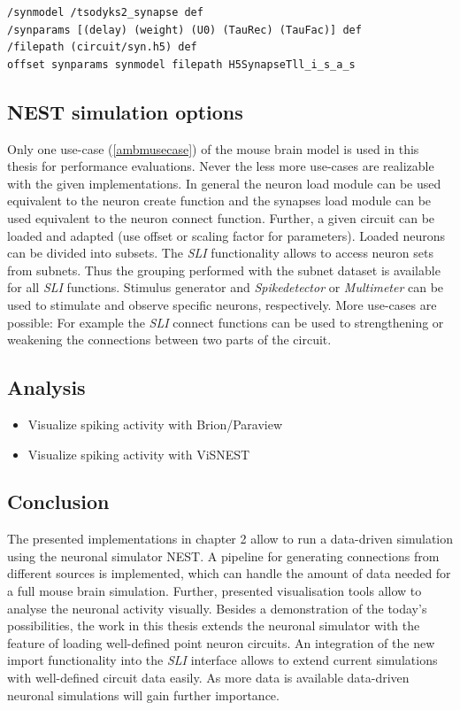 \begin{lstlisting}[label=sliSynapses,caption=Example importing synapses]
/synmodel /tsodyks2_synapse def
/synparams [(delay) (weight) (U0) (TauRec) (TauFac)] def
/filepath (circuit/syn.h5) def
offset synparams synmodel filepath H5SynapseTll_i_s_a_s
\end{lstlisting}

\subsection{NEST simulation options}

Only one use-case (\ref{ambmusecase}) of the mouse brain model is used in this thesis for performance evaluations.
Never the less more use-cases are realizable with the given implementations.
In general the neuron load module can be used equivalent to the neuron create function
and the synapses load module can be used equivalent to the neuron connect function.
Further, a given circuit can be loaded and adapted (use offset or scaling factor for parameters).
Loaded neurons can be divided into subsets. The \emph{SLI} functionality allows to access neuron sets
from subnets. Thus the grouping performed with the subnet dataset is available for all \emph{SLI} functions.
Stimulus generator and \emph{Spikedetector} or \emph{Multimeter} can be used to stimulate
and observe specific neurons, respectively.
More use-cases are possible: For example the \emph{SLI} connect functions can be used to strengthening or weakening the connections between two
parts of the circuit.

\subsection{Analysis}
\begin{itemize}
	  \item Visualize spiking activity with Brion/Paraview
      \item Visualize spiking activity with ViSNEST
\end{itemize}

\subsection{Conclusion}
The presented implementations in chapter 2 allow to run a data-driven simulation using the neuronal simulator NEST.
A pipeline for generating connections from different sources is implemented, which can handle the amount of data needed for 
a full mouse brain simulation. Further, presented visualisation tools allow to analyse the neuronal activity visually.
Besides a demonstration of the today's possibilities, the work in this thesis extends the neuronal simulator with the feature of loading well-defined
point neuron circuits. An integration of the new import functionality into the \emph{SLI}
interface allows to extend current simulations with well-defined circuit data easily.
As more data is available data-driven neuronal simulations will gain further importance.

